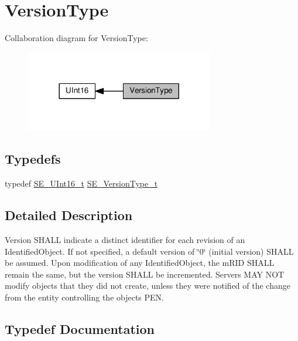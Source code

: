 \hypertarget{group__VersionType}{}\section{Version\+Type}
\label{group__VersionType}
Collaboration diagram for Version\+Type\+:\nopagebreak
\begin{figure}[H]
\begin{center}
\leavevmode
\includegraphics[width=233pt]{group__VersionType}
\end{center}
\end{figure}
\subsection*{Typedefs}
\begin{DoxyCompactItemize}
\item 
typedef \hyperlink{group__UInt16_gac68d541f189538bfd30cfaa712d20d29}{S\+E\+\_\+\+U\+Int16\+\_\+t} \hyperlink{group__VersionType_ga4b8d27838226948397ed99f67d46e2ae}{S\+E\+\_\+\+Version\+Type\+\_\+t}
\end{DoxyCompactItemize}


\subsection{Detailed Description}
Version S\+H\+A\+LL indicate a distinct identifier for each revision of an Identified\+Object. If not specified, a default version of \char`\"{}0\char`\"{} (initial version) S\+H\+A\+LL be assumed. Upon modification of any Identified\+Object, the m\+R\+ID S\+H\+A\+LL remain the same, but the version S\+H\+A\+LL be incremented. Servers M\+AY N\+OT modify objects that they did not create, unless they were notified of the change from the entity controlling the object\textquotesingle{}s P\+EN. 

\subsection{Typedef Documentation}
\mbox{\label{group__VersionType_ga4b8d27838226948397ed99f67d46e2ae}} 
